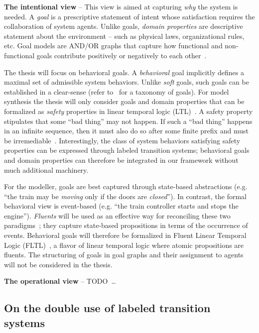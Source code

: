 
\noindent \textbf{The intentional view} -- This view is aimed at capturing \emph{why} the system is needed. A \emph{goal} is a prescriptive statement of intent whose satisfaction requires the collaboration of system agents. Unlike goals, \emph{domain properties} are descriptive statement about the environment -- such as physical laws, organizational rules, etc. Goal models are AND/OR graphs that capture how functional and non-functional goals contribute positively or negatively to each other~\cite{VanLamsweerde:2000, VanLamsweerde:2004}.

The thesis will focus on behavioral goals. A \emph{behavioral} goal implicitly defines a maximal set of admissible system behaviors. Unlike \emph{soft} goals, such goals can be established in a clear-sense (refer to~\cite{VanLamsweerde:2009} for a taxonomy of goals). For model synthesis the thesis will only consider goals and domain properties that can be formalized as \emph{safety} properties in linear temporal logic (LTL)~\cite{Manna:1992}. A safety property stipulates that some ``bad thing'' may not happen. If such a ``bad thing'' happens in an infinite sequence, then it must also do so after some finite prefix and must be irremediable~\cite{Alpern:1986, Giannakopoulou:1999}. Interestingly, the class of system behaviors satisfying safety properties can be expressed through labeled transition systems; behavioral goals and domain properties can therefore be integrated in our framework without much additional machinery.

For the modeller, goals are best captured through state-based abstractions (e.g. ``the train may be \emph{moving} only if the doors are \emph{closed}''). In contrast, the formal behavioral view is event-based (e.g. ``the train controller starts and stops the engine''). \emph{Fluents} will be used as an effective way for reconciling these two paradigms~\cite{Miller:2002}; they capture state-based propositions in terms of the occurrence of events. Behavioral goals will therefore be formalized in Fluent Linear Temporal Logic (FLTL)~\cite{Giannakopoulou:2003}, a flavor of linear temporal logic where atomic propositions are fluents. The structuring of goals in goal graphs and their assignment to agents will not be considered in the thesis.


\noindent \textbf{The operational view} -- TODO~\ldots

\subsection{On the double use of labeled transition systems}

